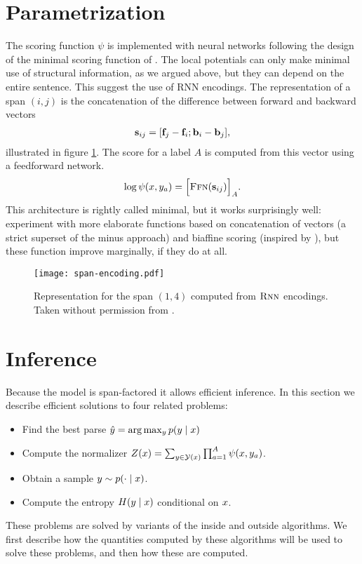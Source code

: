\section{Parametrization}
The scoring function $\psi$ is implemented with neural networks following the design of the minimal scoring function of \citet{stern2017minimal}. The local potentials can only make minimal use of structural information, as we argued above, but they can depend on the entire sentence. This suggest the use of RNN encodings. The representation of a span $(i, j)$ is the concatenation of the difference between forward and backward vectors
\begin{align}
  \label{eq:potential-function}
  \mathbf{s}_{ij} = [\mathbf{f}_j - \mathbf{f}_i; \mathbf{b}_i - \mathbf{b}_j],
\end{align}
illustrated in figure \ref{fig:span-feature}. The score for a label $A$ is computed from this vector using a feedforward network.
\begin{align}
  \log \psi(x, y_a) = \Big[ \textsc{Ffn}( \mathbf{s}_{ij} ) \Big]_{A}.
\end{align}
This architecture is rightly called minimal, but it works surprisingly well: \citet{stern2017minimal} experiment with more elaborate functions based on concatenation of vectors (a strict superset of the minus approach) and biaffine scoring (inspired by \citep{dozat2016deep}), but these function improve marginally, if they do at all.

\begin{figure}
  \texttt{[image: span-encoding.pdf]}
  \caption{Representation for the span $(1, 4)$ computed from $\textsc{Rnn}$ encodings. Taken without permission from \citet{stern2018analyis}.}
  \label{fig:span-feature}
\end{figure}

\section{Inference}
Because the model is span-factored it allows efficient inference. In this section we describe efficient solutions to four related problems:
\begin{itemize}
  \item Find the best parse $\hat{ y } = \arg \max_{y } p(y  \mid x)$
  \item Compute the normalizer $Z(x) = \sum_{ y \in \mathcal{Y}(x) } \prod_{ a=1 }^{ A } \psi( x, y_a )$.
  \item Obtain a sample $y \sim p(\cdot \mid x)$.
  \item Compute the entropy $H(y \mid x)$ conditional on $x$.
\end{itemize}
These problems are solved by variants of the inside and outside algorithms. We first describe how the quantities computed by these algorithms will be used to solve these problems, and then how these are computed.

